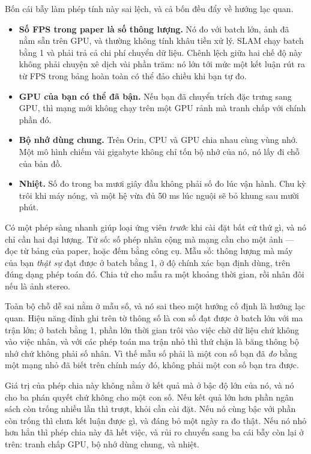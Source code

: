 \documentclass[../../deep_learning.tex]{subfiles}
\begin{document}
Bốn cái bẫy làm phép tính này sai lệch, và cả bốn đều đẩy về hướng lạc quan.

\begin{itemize}
\item \textbf{Số FPS trong paper là số thông lượng.} Nó đo với batch lớn, ảnh đã nằm sẵn trên GPU, và thường không tính khâu tiền xử lý. SLAM chạy batch bằng 1 và phải trả cả chi phí chuyển dữ liệu. Chênh lệch giữa hai chế độ này không phải chuyện xê dịch vài phần trăm: nó lớn tới mức một kết luận rút ra từ FPS trong bảng hoàn toàn có thể đảo chiều khi bạn tự đo.
\item \textbf{GPU của bạn có thể đã bận.} Nếu bạn đã chuyển trích đặc trưng sang GPU, thì mạng mới không chạy trên một GPU rảnh mà tranh chấp với chính phần đó.
\item \textbf{Bộ nhớ dùng chung.} Trên Orin, CPU và GPU chia nhau cùng vùng nhớ. Một mô hình chiếm vài gigabyte không chỉ tốn bộ nhớ của nó, nó lấy đi chỗ của bản đồ.
\item \textbf{Nhiệt.} Số đo trong ba mươi giây đầu không phải số đo lúc vận hành. Chu kỳ trôi khi máy nóng, và một hệ vừa đủ 50 ms lúc nguội sẽ bỏ khung sau mười phút.
\end{itemize}

Có một phép sàng nhanh giúp loại ứng viên \emph{trước} khi cài đặt bất cứ thứ gì, và nó chỉ cần hai đại lượng. Tử số: số phép nhân cộng mà mạng cần cho một ảnh --- đọc từ bảng của paper, hoặc đếm bằng công cụ. Mẫu số: thông lượng mà máy của bạn \emph{thật sự} đạt được ở batch bằng 1, ở độ chính xác bạn định dùng, trên đúng dạng phép toán đó. Chia tử cho mẫu ra một khoảng thời gian, rồi nhân đôi nếu là ảnh stereo.

Toàn bộ chỗ dễ sai nằm ở mẫu số, và nó sai theo một hướng cố định là hướng lạc quan. Hiệu năng đỉnh ghi trên tờ thông số là con số đạt được ở batch lớn với ma trận lớn; ở batch bằng 1, phần lớn thời gian trôi vào việc chờ dữ liệu chứ không vào việc nhân, và với các phép toán ma trận nhỏ thì thứ chặn là băng thông bộ nhớ chứ không phải số nhân. Vì thế mẫu số phải là một con số bạn đã \emph{đo} bằng một mạng nhỏ đã biết trên chính máy đó, không phải một con số bạn tra được.

Giá trị của phép chia này không nằm ở kết quả mà ở bậc độ lớn của nó, và nó cho ba phán quyết chứ không cho một con số. Nếu kết quả lớn hơn phần ngân sách còn trống nhiều lần thì trượt, khỏi cần cài đặt. Nếu nó cùng bậc với phần còn trống thì chưa kết luận được gì, và đáng bỏ một ngày ra đo thật. Nếu nó nhỏ hơn hẳn thì phép chia này đã hết việc, và rủi ro chuyển sang ba cái bẫy còn lại ở trên: tranh chấp GPU, bộ nhớ dùng chung, và nhiệt.
\end{document}
